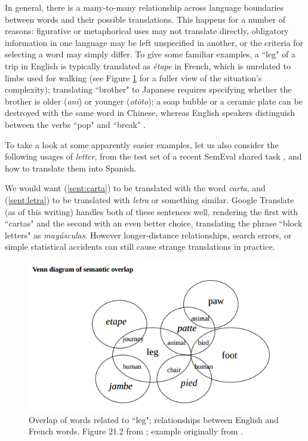 In general, there is a many-to-many relationship across language boundaries
between words and their possible translations.
This happens for a number of reasons: figurative or metaphorical uses may not
translate directly,
obligatory information in one language may be left unspecified in another,
or the criteria for selecting a word may simply differ.
To give some familiar examples, a ``leg" of a trip in English is typically
translated as \emph{étape} in French, which is unrelated to limbs used for
walking (see Figure \ref{fig:leg} for a fuller view of the situation's
complexity);
translating ``brother" to Japanese requires specifying whether the brother is
older (\emph{ani}) or younger (\emph{ot\=oto});
a soap bubble or a ceramic plate can be destroyed with the same word in
Chinese, whereas English speakers distinguish between the verbs
``pop" and ``break" \cite{majid2007semantic}.

To take a look at some apparently easier examples, let us also consider the
following usages of \emph{letter}, from the test set of a recent SemEval shared
task \cite{task10}, and how to translate them into Spanish.

\label{sent:carta}
\label{sent:letra}

We would want (\ref{sent:carta}) to be translated with the word \emph{carta},
and (\ref{sent:letra}) to be translated with \emph{letra} or something similar.
Google Translate (as of this writing) handles both of these sentences well,
rendering the first with ``cartas" and the second with an even better choice,
translating the phrase ``block letters" as \emph{mayúsculas}.
However longer-distance relationships, search errors, or simple statistical
accidents can still cause strange translations in practice.

\begin{figure}
  \includegraphics[width=12cm]{hutchins-leg-etc.png}
  \caption{Overlap of words related to ``leg"; relationships between English
  and French words. Figure 21.2 from \protect\cite{slp1}; example originally
  from \protect\cite[Chapter 6]{hutchins1992introduction}.}
  \label{fig:leg}
\end{figure}

